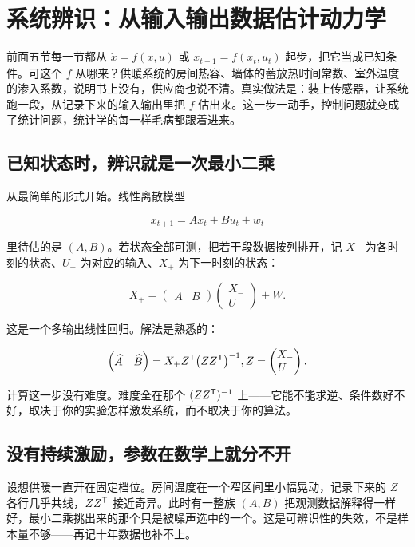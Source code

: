 \section{系统辨识：从输入输出数据估计动力学}
\label{sec:16-Control-and-Reinforcement-Learning/01-Optimal-Control/07}

前面五节每一节都从 \(\dot x = f(x,u)\) 或 \(x_{t+1}=f(x_t,u_t)\) 起步，把它当成已知条件。可这个 \(f\) 从哪来？供暖系统的房间热容、墙体的蓄放热时间常数、室外温度的渗入系数，说明书上没有，供应商也说不清。真实做法是：装上传感器，让系统跑一段，从记录下来的输入输出里把 \(f\) 估出来。这一步一动手，控制问题就变成了统计问题，统计学的每一样毛病都跟着进来。

\subsection{已知状态时，辨识就是一次最小二乘}

从最简单的形式开始。线性离散模型

\[
x_{t+1} = A x_t + B u_t + w_t
\]

里待估的是 \((A,B)\)。若状态全部可测，把若干段数据按列排开，记 \(X_-\) 为各时刻的状态、\(U_-\) 为对应的输入、\(X_+\) 为下一时刻的状态：

\[
X_+ = \begin{pmatrix} A & B\end{pmatrix}
\begin{pmatrix} X_- \\ U_- \end{pmatrix} + W .
\]

这是一个多输出线性回归。解法是熟悉的：

\[
\begin{pmatrix}\widehat A & \widehat B\end{pmatrix}
= X_+ Z^{\mathsf{T}}\bigl(Z Z^{\mathsf{T}}\bigr)^{-1},
\space
Z = \begin{pmatrix} X_- \\ U_-\end{pmatrix}.
\]

计算这一步没有难度。难度全在那个 \((ZZ^{\mathsf{T}})^{-1}\) 上——它能不能求逆、条件数好不好，取决于你的实验怎样激发系统，而不取决于你的算法。

\subsection{没有持续激励，参数在数学上就分不开}

设想供暖一直开在固定档位。房间温度在一个窄区间里小幅晃动，记录下来的 \(Z\) 各行几乎共线，\(ZZ^{\mathsf{T}}\) 接近奇异。此时有一整族 \((A,B)\) 把观测数据解释得一样好，最小二乘挑出来的那个只是被噪声选中的一个。这是可辨识性的失效，不是样本量不够——再记十年数据也补不上。

